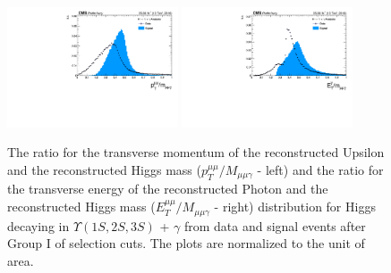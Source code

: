 \begin{figure}[!htbp]
\begin{center}
\includegraphics[width=0.45\textwidth]{figures_and_tables/outputPlots/HtoUpsilon_Cat0_ZZZZZ/au/data_x_mc/noKinCuts/h_noKin_upsilonPt_over_zMass}\hspace*{1.cm}
\includegraphics[width=0.45\textwidth]{figures_and_tables/outputPlots/HtoUpsilon_Cat0_ZZZZZ/au/data_x_mc/noKinCuts/h_noKin_photonPt_over_zMass}
\end{center}\vspace*{-.5cm}
\caption{The ratio for the transverse momentum of the reconstructed Upsilon and the reconstructed Higgs mass ($p_{T}^{\mu\mu}/M_{\mu\mu\gamma}$ - left) and the ratio for the transverse energy of the reconstructed Photon and the reconstructed Higgs mass ($E_{T}^{\mu\mu}/M_{\mu\mu\gamma}$ - right) distribution for Higgs decaying in $\Upsilon(1S,2S,3S)$ + $\gamma$ from data and signal events after Group I of selection cuts. The plots are normalized to the unit of area.}
\label{fig:energy_ration_HtoUpsilon_Cat0}
\end{figure}

